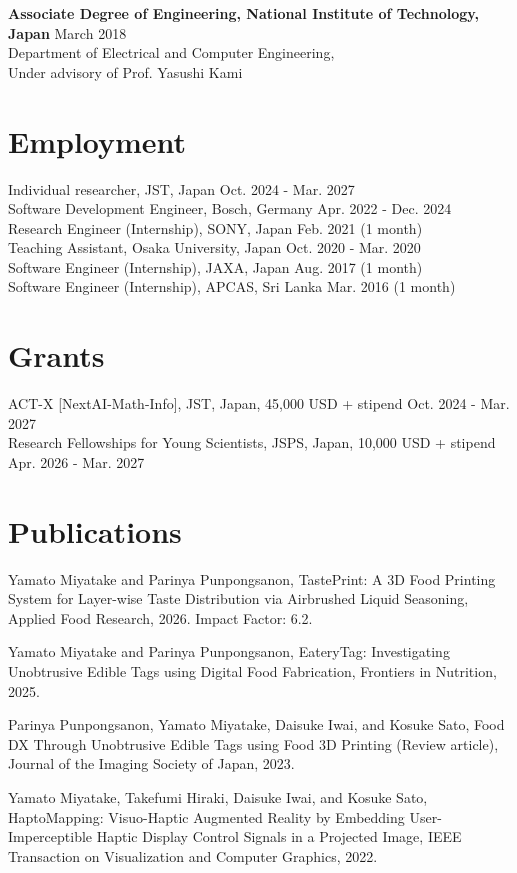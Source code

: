 \documentclass[10pt,a4paper]{article}
\newcommand{\daterange}[1]{\hfill #1}
\newcommand{\pubheading}[1]{\vspace{3pt}{\bfseries\sffamily\small #1}\vspace{-3pt}}
\begin{document}
\textbf{Associate Degree of Engineering, National Institute of Technology, Japan} \daterange{March 2018}\\
Department of Electrical and Computer Engineering,\\
Under advisory of Prof. Yasushi Kami

\section*{Employment}
Individual researcher, JST, Japan \daterange{Oct. 2024 - Mar. 2027}\\
Software Development Engineer, Bosch, Germany \daterange{Apr. 2022 - Dec. 2024}\\
Research Engineer (Internship), SONY, Japan \daterange{Feb. 2021 (1 month)}\\
Teaching Assistant, Osaka University, Japan \daterange{Oct. 2020 - Mar. 2020}\\
Software Engineer (Internship), JAXA, Japan \daterange{Aug. 2017 (1 month)}\\
Software Engineer (Internship), APCAS, Sri Lanka \daterange{Mar. 2016 (1 month)}

\section*{Grants}
ACT-X [NextAI-Math-Info], JST, Japan, 45,000 USD + stipend \daterange{Oct. 2024 - Mar. 2027}\\
Research Fellowships for Young Scientists, JSPS, Japan, 10,000 USD + stipend \daterange{Apr. 2026 - Mar. 2027}

\section*{Publications}
\pubheading{JOURNAL ARTICLES}
\begin{publist}
\item Yamato Miyatake and Parinya Punpongsanon, TastePrint: A 3D Food Printing System for Layer-wise Taste Distribution via Airbrushed Liquid Seasoning, Applied Food Research, 2026. Impact Factor: 6.2.
\item Yamato Miyatake and Parinya Punpongsanon, EateryTag: Investigating Unobtrusive Edible Tags using Digital Food Fabrication, Frontiers in Nutrition, 2025.
\item Parinya Punpongsanon, Yamato Miyatake, Daisuke Iwai, and Kosuke Sato, Food DX Through Unobtrusive Edible Tags using Food 3D Printing (Review article), Journal of the Imaging Society of Japan, 2023.
\item Yamato Miyatake, Takefumi Hiraki, Daisuke Iwai, and Kosuke Sato, HaptoMapping: Visuo-Haptic Augmented Reality by Embedding User-Imperceptible Haptic Display Control Signals in a Projected Image, IEEE Transaction on Visualization and Computer Graphics, 2022.
\end{publist}
\end{document}
